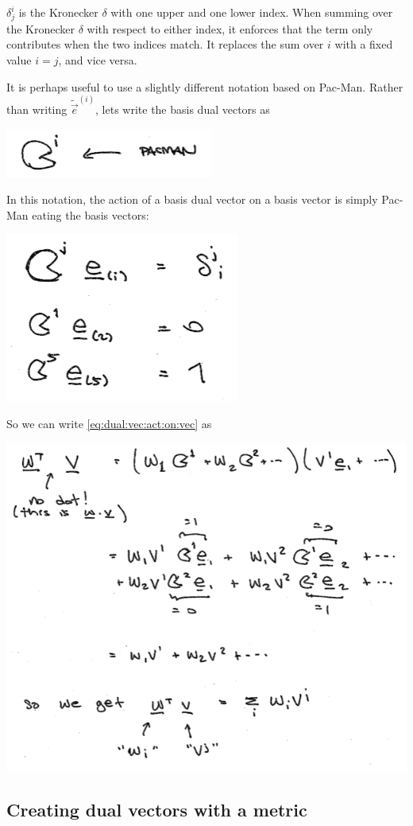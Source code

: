 \documentclass[
  11pt,
	colorful,
	raggedright,
]{tufte-style-thesis-flip}
\begin{document}
$\delta^i_j$ is the Kronecker $\delta$ with one upper and one lower index. When summing over the Kronecker $\delta$ with respect to either index, it enforces that the term only contributes when the two indices match. It replaces the sum over $i$ with a fixed value $i=j$, and vice versa.

It is perhaps useful to use a slightly different notation based on Pac-Man. Rather than writing $\tilde{\vec{e}}^{(i)}$, lets write the basis dual vectors as
\begin{center}
\includegraphics[width=.4\textwidth]{figures/lec05_pacman.png}
\end{center}
In this notation, the action of a basis dual vector on a basis vector is simply Pac-Man eating the basis vectors:
\begin{center}
\includegraphics[width=.4\textwidth]{figures/lec05_paceats.png}
\end{center}
So we can write \eqref{eq:dual:vec:act:on:vec} as
\begin{center}
\includegraphics[width=.7\textwidth]{figures/lec05_paccontract.png}
\end{center}

\subsection{Creating dual vectors with a metric}
\end{document}
